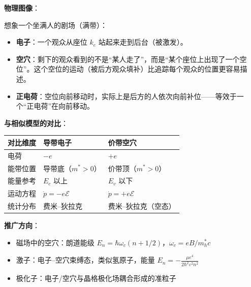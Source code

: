 \begin{insightbox}[物理图像与模型关联]
\textbf{物理图像}：

想象一个坐满人的剧场（满带）：
\begin{itemize}[nosep]
    \item \textbf{电子}：一个观众从座位 $k_e$ 站起来走到后台（被激发）。
    \item \textbf{空穴}：剩下的观众看到的不是``某人走了''，而是``某个座位上出现了一个空位''。这个空位的运动（被后方观众填补）比追踪每个观众的位置更容易描述。
    \item \textbf{正电荷}：空位向前移动时，实际上是后方的人依次向前补位——等效于一个``正电荷''在向前移动。
\end{itemize}

\textbf{与相似模型的对比}：
\begin{center}
\begin{tabular}{lll}
\toprule
\textbf{对比维度} & \textbf{导带电子} & \textbf{价带空穴} \\
\midrule
电荷 & $-e$ & $+e$ \\
能带位置 & 导带底（$m^*>0$） & 价带顶（$m^*>0$） \\
能量参考 & $E_c$ 以上 & $E_v$ 以下 \\
运动方程 & $\dot{p}=-e\mathcal{E}$ & $\dot{p}=+e\mathcal{E}$ \\
统计分布 & 费米--狄拉克 & 费米--狄拉克（空态） \\
\bottomrule
\end{tabular}
\end{center}

\textbf{推广方向}：
\begin{itemize}[nosep]
    \item 磁场中的空穴：朗道能级 $E_n=\hbar\omega_c(n+1/2)$，$\omega_c=eB/m_h^*c$
    \item 激子：电子--空穴束缚态，类似氢原子，能量 $E_n=-\frac{\mu e^4}{2\hbar^2\varepsilon^2n^2}$
    \item 极化子：电子/空穴与晶格极化场耦合形成的准粒子
\end{itemize}
\end{insightbox}

